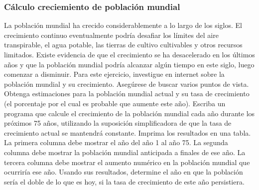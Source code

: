 \subsubsection{Cálculo creciemiento de población mundial}
La población mundial ha crecido considerablemente a lo largo de los siglos.
El crecimiento continuo eventualmente podría desafiar los límites del aire transpirable, el agua potable, las tierras de cultivo cultivables y otros recursos limitados.
Existe evidencia de que el crecimiento se ha desacelerado en los últimos años y que la población mundial podría alcanzar algún tiempo en este siglo, luego comenzar a disminuir.
Para este ejercicio, investigue en internet sobre la población mundial y su crecimiento.
Asegúrese de buscar varios puntos de vista.
Obtenga estimaciones para la población mundial actual y su tasa de crecimiento (el porcentaje por el cual es probable que aumente este año).
Escriba un programa que calcule el crecimiento de la población mundial cada año durante los próximos 75 años, utilizando la suposición simplificadora de que la tasa de crecimiento actual se mantendrá constante.
Imprima los resultados en una tabla.
La primera columna debe mostrar el año del año 1 al año 75.
La segunda columna debe mostrar la población mundial anticipada a finales de ese año.
La tercera columna debe mostrar el aumento numérico en la población mundial que ocurriría ese año.
Usando sus resultados, determine el año en que la población sería el doble de lo que es hoy, si la tasa de crecimiento de este año persistiera.

